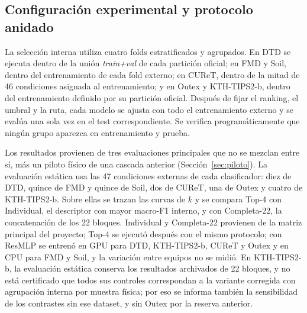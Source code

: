 \documentclass[a4paper,fleqn]{cas-sc}
\begin{document}
\subsection{Configuración experimental y protocolo anidado}\label{sec:protocolo}

La selección interna utiliza cuatro folds estratificados y agrupados. En DTD se ejecuta dentro de la unión \emph{train+val} de cada partición oficial; en FMD y Soil, dentro del entrenamiento de cada fold externo; en CUReT, dentro de la mitad de 46 condiciones asignada al entrenamiento; y en Outex y KTH-TIPS2-b, dentro del entrenamiento definido por su partición oficial. Después de fijar el ranking, el umbral y la ruta, cada modelo se ajusta con todo el entrenamiento externo y se evalúa una sola vez en el test correspondiente. Se verifica programáticamente que ningún grupo aparezca en entrenamiento y prueba.

Los resultados provienen de tres evaluaciones principales que no se mezclan entre sí, más un piloto físico de una cascada anterior (Sección~\ref{sec:piloto}). La evaluación estática usa las 47 condiciones externas de cada clasificador: diez de DTD, quince de FMD y quince de Soil, dos de CUReT, una de Outex y cuatro de KTH-TIPS2-b. Sobre ellas se trazan las curvas de $k$ y se compara Top-4 con Individual, el descriptor con mayor macro-F1 interno, y con Completa-22, la concatenación de los 22 bloques. Individual y Completa-22 provienen de la matriz principal del proyecto; Top-4 se ejecutó después con el mismo protocolo; con ResMLP se entrenó en GPU para DTD, KTH-TIPS2-b, CUReT y Outex y en CPU para FMD y Soil, y la variación entre equipos no se midió. En KTH-TIPS2-b, la evaluación estática conserva los resultados archivados de 22 bloques, y no está certificado que todos sus controles correspondan a la variante corregida con agrupación interna por muestra física; por eso se informa también la sensibilidad de los contrastes sin ese dataset, y sin Outex por la reserva anterior.
\end{document}
